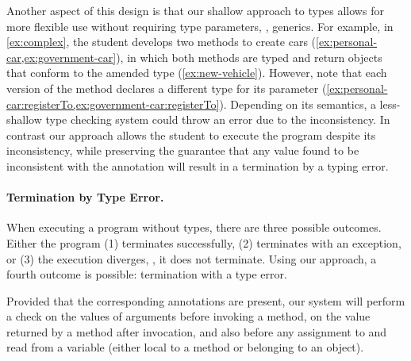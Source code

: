 Another aspect of this design is
that our shallow approach to types
allows for more flexible use 
without requiring type parameters, \ie, generics.
For example, in \cref{ex:complex}, the student
develops two methods to create cars 
(\cref{ex:personal-car,ex:government-car}),
in which both methods are typed and return objects that conform to
the amended  type (\cref{ex:new-vehicle}).
However, note that each version of the  method
declares a different type for its parameter
(\cref{ex:personal-car:registerTo,ex:government-car:registerTo}).
Depending on its semantics,
a less-shallow type checking system could throw an error
due to the inconsistency.
In contrast
our approach allows the student to execute the program 
despite its inconsistency, 
while preserving the guarantee that any value found to be
inconsistent with the annotation will result in
a termination by a typing error.




\paragraph{Termination by Type Error.}
\label{sec:term-type-error}

When executing a program without types, there are three possible outcomes.
Either the program (1) terminates successfully,
(2) terminates with an exception, or 
(3) the execution diverges, \ie, it does not terminate.
Using our approach, a
fourth outcome is possible: termination with a type error.

Provided that the corresponding annotations are present, 
our system will perform a check
on the values of arguments before invoking a method, 
on the value returned by a method after invocation, and
also before any assignment to and read from a variable 
(either local to a method or belonging to an object). 

